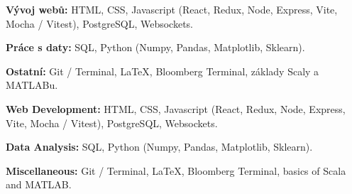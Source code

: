 \ifczech

\textbf{Vývoj webů:} HTML, CSS, Javascript (React, Redux, Node, Express, Vite, Mocha / Vitest), PostgreSQL, Websockets. \par
\textbf{Práce s daty:} SQL, Python (Numpy, Pandas, Matplotlib, Sklearn). \par
\textbf{Ostatní:} Git / Terminal, LaTeX, Bloomberg Terminal, základy Scaly a MATLABu. \par

\else

\textbf{Web Development:} HTML, CSS, Javascript (React, Redux, Node, Express, Vite, Mocha / Vitest), PostgreSQL, Websockets. \par
\textbf{Data Analysis:} SQL, Python (Numpy, Pandas, Matplotlib, Sklearn). \par
\textbf{Miscellaneous:} Git / Terminal, LaTeX, Bloomberg Terminal, basics of Scala and MATLAB. \par

\fi